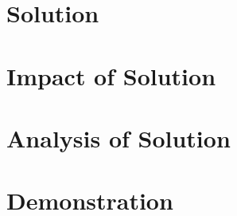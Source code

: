 \documentclass[conference]{IEEEtran}
\begin{document}
\section{Solution}\label{sec:solution}

\section{Impact of Solution}\label{sec:impact}

\section{Analysis of Solution}\label{sec:analysis}

\section{Demonstration}\label{sec:demo}




\end{document}
